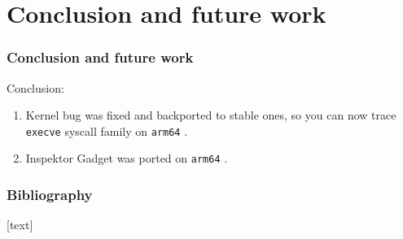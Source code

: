 \documentclass[table, trans, aspectratio = 169]{beamer}
\begin{document}
	\section{Conclusion and future work}
	\begin{frame}
		\frametitle{Conclusion and future work}

		Conclusion:
		\begin{enumerate}
			\item Kernel bug was fixed and backported to stable ones, so you can now trace \texttt{execve} syscall family on \texttt{arm64} \cite{linux_kernel_contributors_arm64_2022, levin_patch_2022}.
			\item Inspektor Gadget was ported on \texttt{arm64} \cite{inspektor_gadget_contributors_add_2022}.
		\end{enumerate}

		\bigskip


		\bigskip

	\end{frame}

	\begin{frame}
		\frametitle{Bibliography}

		\begin{scriptsize}
			
			
		\end{scriptsize}
	\end{frame}
\end{document}
